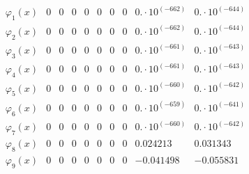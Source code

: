 \documentclass{article}
\begin{document}
\begin{landscape}
$$\begin{array}{l|lllllllll}
 \varphi_1(x) & 0 & 0 & 0 & 0 & 0 & 0 & 0 & 0.\cdot 10^{(-662)} & 0.\cdot 10^{(-644)} \\ 
\varphi_2(x) & 0 & 0 & 0 & 0 & 0 & 0 & 0 & 0.\cdot 10^{(-662)} & 0.\cdot 10^{(-644)} \\ 
\varphi_3(x) & 0 & 0 & 0 & 0 & 0 & 0 & 0 & 0.\cdot 10^{(-661)} & 0.\cdot 10^{(-643)} \\ 
\varphi_4(x) & 0 & 0 & 0 & 0 & 0 & 0 & 0 & 0.\cdot 10^{(-661)} & 0.\cdot 10^{(-643)} \\ 
\varphi_5(x) & 0 & 0 & 0 & 0 & 0 & 0 & 0 & 0.\cdot 10^{(-660)} & 0.\cdot 10^{(-642)} \\ 
\varphi_6(x) & 0 & 0 & 0 & 0 & 0 & 0 & 0 & 0.\cdot 10^{(-659)} & 0.\cdot 10^{(-641)} \\ 
\varphi_7(x) & 0 & 0 & 0 & 0 & 0 & 0 & 0 & 0.\cdot 10^{(-660)} & 0.\cdot 10^{(-642)} \\ 
\varphi_8(x) & 0 & 0 & 0 & 0 & 0 & 0 & 0 & 0.024213 & 0.031343 \\ 
\varphi_9(x) & 0 & 0 & 0 & 0 & 0 & 0 & 0 & -0.041498 & -0.055831 \\ 
\end{array} $$ 
\end{landscape} 
\end{document}
